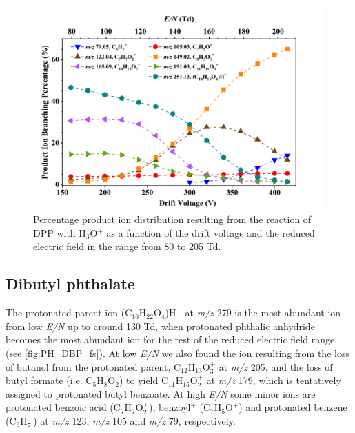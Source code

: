     \begin{figure}[htb]%
    \centering
    \includegraphics[height=0.35\textheight]{pics/DPP-BR.png}
    \caption{Percentage product ion distribution resulting from the reaction of DPP with H$_3$O$^+$ as a function of the drift voltage and the reduced electric field in the range from 80 to 205 Td.}
    \label{fig:PH_DPP_fs}
    \end{figure}
%



\subsection{Dibutyl phthalate}

%
The protonated parent ion  (C$_{16}$H$_{22}$O$_4$)H$^+$ at \textit{m/z} 279 is the most abundant ion from low \textit{E/N} up to around 130 Td, when protonated phthalic anhydride becomes the most abundant ion for the rest of the reduced electric field range (see \autoref{fig:PH_DBP_fs}).
%
At low \textit{E/N} we also found the  ion resulting from the loss of butanol from the protonated parent, C$_{12}$H$_{13}$O$_3^+$ at \textit{m/z} 205,  and the loss of butyl formate (i.e. C$_{5}$H$_{8}$O$_2$) to yield C$_{11}$H$_{15}$O$_2^+$ at \textit{m/z} 179, which is tentatively assigned to protonated butyl benzoate.
%
At high \textit{E/N} some minor ions are protonated benzoic acid (C$_{7}$H$_{7}$O$_2^+$), benzoyl$^+$ (C$_7$H$_{5}$O$^+$) and protonated benzene (C$_6$H$_{7}^+$) at \textit{m/z} 123, \textit{m/z} 105 and \textit{m/z} 79, respectively.


